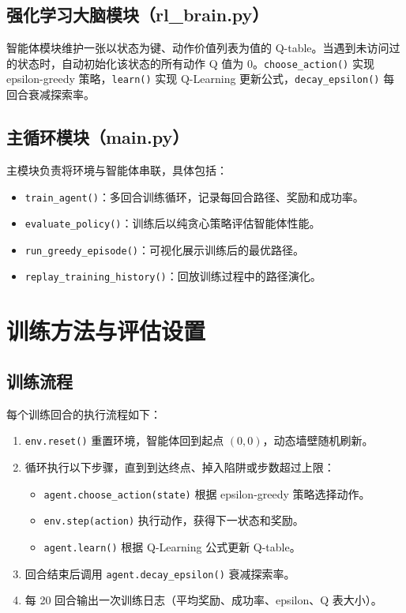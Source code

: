 \documentclass[UTF8,12pt,a4paper]{ctexart}
\begin{document}
\subsection{强化学习大脑模块（rl\_brain.py）}
智能体模块维护一张以状态为键、动作价值列表为值的 Q-table。当遇到未访问过的状态时，自动初始化该状态的所有动作 Q 值为 0。\texttt{choose\_action()} 实现 epsilon-greedy 策略，\texttt{learn()} 实现 Q-Learning 更新公式，\texttt{decay\_epsilon()} 每回合衰减探索率。

\subsection{主循环模块（main.py）}
主模块负责将环境与智能体串联，具体包括：
\begin{itemize}
    \item \texttt{train\_agent()}：多回合训练循环，记录每回合路径、奖励和成功率。
    \item \texttt{evaluate\_policy()}：训练后以纯贪心策略评估智能体性能。
    \item \texttt{run\_greedy\_episode()}：可视化展示训练后的最优路径。
    \item \texttt{replay\_training\_history()}：回放训练过程中的路径演化。
\end{itemize}

\section{训练方法与评估设置}

\subsection{训练流程}
每个训练回合的执行流程如下：
\begin{enumerate}
    \item \texttt{env.reset()} 重置环境，智能体回到起点 $(0, 0)$，动态墙壁随机刷新。
    \item 循环执行以下步骤，直到到达终点、掉入陷阱或步数超过上限：
    \begin{itemize}
        \item \texttt{agent.choose\_action(state)} 根据 epsilon-greedy 策略选择动作。
        \item \texttt{env.step(action)} 执行动作，获得下一状态和奖励。
        \item \texttt{agent.learn()} 根据 Q-Learning 公式更新 Q-table。
    \end{itemize}
    \item 回合结束后调用 \texttt{agent.decay\_epsilon()} 衰减探索率。
    \item 每 20 回合输出一次训练日志（平均奖励、成功率、epsilon、Q 表大小）。
\end{enumerate}
\end{document}
